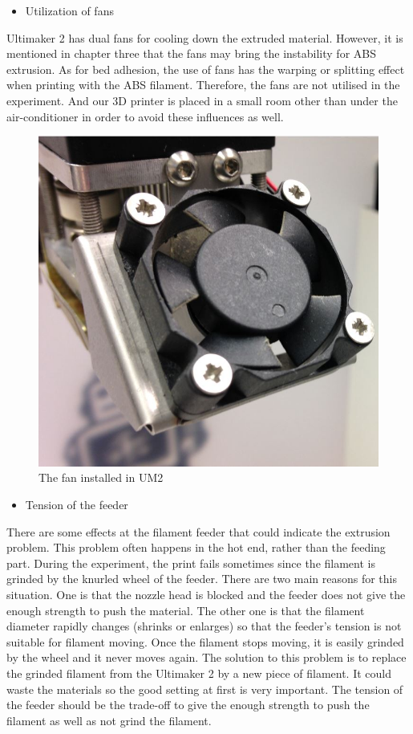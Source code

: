 \begin{itemize}
\item Utilization of fans
\end{itemize}
Ultimaker 2 has dual fans for cooling down the extruded material. However, it is mentioned in chapter three that the fans may bring the instability for ABS extrusion. As for bed adhesion, the use of fans has the warping or splitting effect when printing with the ABS filament. Therefore, the fans are not utilised in the experiment. And our 3D printer is placed in a small room other than under the air-conditioner in order to avoid these influences as well.
\begin{figure}[htbp]
  \centering
  \includegraphics[scale=0.4]{Figs5//fan.JPG}
  \caption[The fan installed in UM2]{\footnotesize The fan installed in UM2}
  \label{Fig:fan}
\end{figure}

\begin{itemize}
\item Tension of the feeder
\end{itemize}
There are some effects at the filament feeder that could indicate the extrusion problem. This problem often happens in the hot end, rather than the feeding part. During the experiment, the print fails sometimes since the filament is grinded by the knurled wheel of the feeder. There are two main reasons for this situation. One is that the nozzle head is blocked and the feeder does not give the enough strength to push the material.  The other one is that the filament diameter rapidly changes (shrinks or enlarges) so that the feeder's tension is not suitable for filament moving. Once the filament stops moving, it is easily grinded by the wheel and it never moves again. The solution to this problem is to replace the grinded filament from the Ultimaker 2 by a new piece of filament. It could waste the materials so the good setting at first is very important. The tension of the feeder should be the trade-off to give the enough strength to push the filament as well as not grind the filament.

